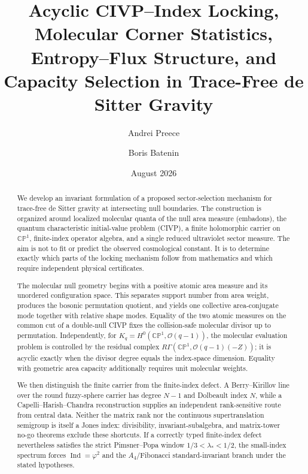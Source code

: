 \documentclass[aps,prd,preprint,nofootinbib,superscriptaddress]{revtex4-2}
\theoremstyle{definition}
\theoremstyle{remark}
\newcommand{\Ind}{\operatorname{Ind}}
\newcommand{\cO}{\mathcal O}
\newcommand{\CP}{\mathbb{CP}}
\begin{document}
\title{Acyclic CIVP--Index Locking, Molecular Corner Statistics, Entropy--Flux Structure, and Capacity Selection in Trace-Free de Sitter Gravity}

\author{Andrei Preece}
\author{Boris Batenin}

\date{August 2026}

\begin{abstract}
We develop an invariant formulation of a proposed sector-selection mechanism for trace-free de Sitter gravity at intersecting null boundaries.  The construction is organized around localized molecular quanta of the null area measure (embadons), the quantum characteristic initial-value problem (CIVP), a finite holomorphic carrier on $\CP^1$, finite-index operator algebra, and a single reduced ultraviolet sector measure.  The aim is not to fit or predict the observed cosmological constant.  It is to determine exactly which parts of the locking mechanism follow from mathematics and which require independent physical certificates.

The molecular null geometry begins with a positive atomic area measure and its unordered configuration space.  This separates support number from area weight, produces the bosonic permutation quotient, and yields one collective area-conjugate mode together with relative shape modes.  Equality of the two atomic measures on the common cut of a double-null CIVP fixes the collision-safe molecular divisor up to permutation.  Independently, for $K_q=H^0(\CP^1,\cO(q-1))$, the molecular evaluation problem is controlled by the residual complex $R\Gamma(\CP^1,\cO(q-1)(-Z))$; it is acyclic exactly when the divisor degree equals the index-space dimension.  Equality with geometric area capacity additionally requires unit molecular weights.

We then distinguish the finite carrier from the finite-index defect.  A Berry--Kirillov line over the round fuzzy-sphere carrier has degree $N-1$ and Dolbeault index $N$, while a Capelli--Harish--Chandra reconstruction supplies an independent rank-sensitive route from central data.  Neither the matrix rank nor the continuous supertranslation semigroup is itself a Jones index: divisibility, invariant-subalgebra, and matrix-tower no-go theorems exclude these shortcuts.  If a correctly typed finite-index defect nevertheless satisfies the strict Pimsner--Popa window $1/3<\lambda_*<1/2$, the small-index spectrum forces $\Ind=\varphi^2$ and the $A_4$/Fibonacci standard-invariant branch under the stated hypotheses.


\end{abstract}
\end{document}

